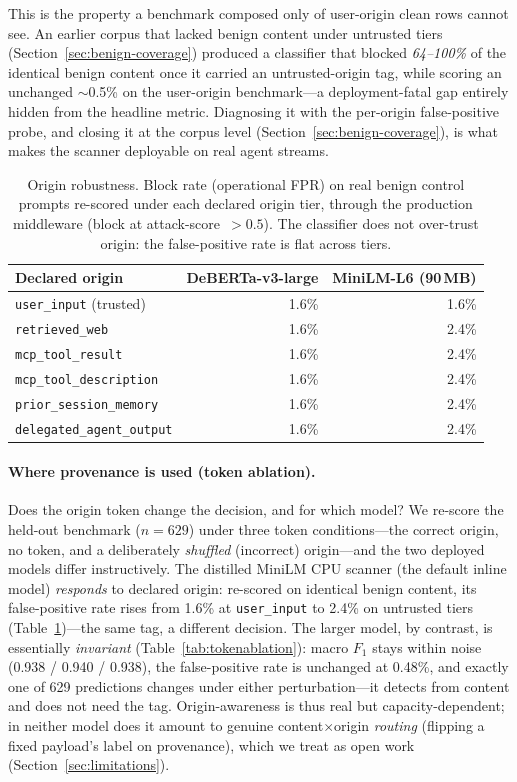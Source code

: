 \documentclass{article}
\begin{document}
This is the property a benchmark composed only of user-origin clean rows cannot see. An earlier corpus that lacked benign content under untrusted tiers (Section~\ref{sec:benign-coverage}) produced a classifier that blocked \emph{64--100\%} of the identical benign content once it carried an untrusted-origin tag, while scoring an unchanged $\sim$0.5\% on the user-origin benchmark---a deployment-fatal gap entirely hidden from the headline metric. Diagnosing it with the per-origin false-positive probe, and closing it at the corpus level (Section~\ref{sec:benign-coverage}), is what makes the scanner deployable on real agent streams.

\begin{table}[t]
\centering
\small
\caption{Origin robustness. Block rate (operational FPR) on real benign control prompts re-scored under each declared origin tier, through the production middleware (block at attack-score~$>0.5$). The classifier does not over-trust origin: the false-positive rate is flat across tiers.}
\label{tab:fprorigin}
\begin{tabular}{lrr}
\toprule
\textbf{Declared origin} & \textbf{DeBERTa-v3-large} & \textbf{MiniLM-L6 (90\,MB)} \\
\midrule
\texttt{user\_input} (trusted) & 1.6\% & 1.6\% \\
\texttt{retrieved\_web} & 1.6\% & 2.4\% \\
\texttt{mcp\_tool\_result} & 1.6\% & 2.4\% \\
\texttt{mcp\_tool\_description} & 1.6\% & 2.4\% \\
\texttt{prior\_session\_memory} & 1.6\% & 2.4\% \\
\texttt{delegated\_agent\_output} & 1.6\% & 2.4\% \\
\bottomrule
\end{tabular}
\end{table}

\paragraph{Where provenance is used (token ablation).} Does the origin token change the decision, and for which model? We re-score the held-out benchmark ($n=629$) under three token conditions---the correct origin, no token, and a deliberately \emph{shuffled} (incorrect) origin---and the two deployed models differ instructively. The distilled MiniLM CPU scanner (the default inline model) \emph{responds} to declared origin: re-scored on identical benign content, its false-positive rate rises from 1.6\% at \texttt{user\_input} to 2.4\% on untrusted tiers (Table~\ref{tab:fprorigin})---the same tag, a different decision. The larger model, by contrast, is essentially \emph{invariant} (Table~\ref{tab:tokenablation}): macro $F_1$ stays within noise (0.938 / 0.940 / 0.938), the false-positive rate is unchanged at 0.48\%, and exactly one of 629 predictions changes under either perturbation---it detects from content and does not need the tag. Origin-awareness is thus real but capacity-dependent; in neither model does it amount to genuine content$\times$origin \emph{routing} (flipping a fixed payload's label on provenance), which we treat as open work (Section~\ref{sec:limitations}).
\end{document}
